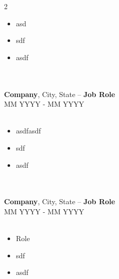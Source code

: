 \documentclass{article}
\begin{document}
\begin{multicols}{2}
    \begin{minipage}{200pt}
        \begin{itemize}
            \setlength\itemsep{0.001em} %
            \setlength\parsep{0.001em} %
            \item asd 
            \item sdf 
            \item asdf
        \end{itemize}
    \end{minipage}
    \\
    \vspace{20pt}
    \\
    \textbf{\fontsize{14}{24}\selectfont Company}, City, State -- \textbf{\fontsize{14}{24}\selectfont Job Role}\\
    MM YYYY - MM YYYY \\
    \vspace{1pt}
    \\
    \begin{minipage}{200pt}
        \begin{itemize}
            \setlength\itemsep{0.001em} %
            \setlength\parsep{0.001em} %
            \item asdfasdf 
            \item sdf 
            \item asdf
        \end{itemize}
    \end{minipage}
    \\
    \vspace{20pt}
    \\
    \textbf{\fontsize{14}{24}\selectfont Company}, City, State -- \textbf{\fontsize{14}{24}\selectfont Job Role}\\
    MM YYYY - MM YYYY \\
    \vspace{1pt}
    \\
    \begin{minipage}{200pt}
        \begin{itemize}
            \setlength\itemsep{0.001em} %
            \setlength\parsep{0.001em} %
            \item Role 
            \item sdf 
            \item asdf

\end{itemize}
\end{minipage}
\end{multicols}
\end{document}
